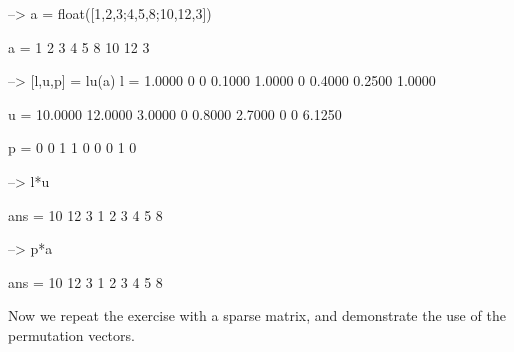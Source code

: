 \begin{DoxyVerbInclude}
--> a = float([1,2,3;4,5,8;10,12,3])

a = 
  1  2  3 
  4  5  8 
 10 12  3 

--> [l,u,p] = lu(a)
l = 
    1.0000         0         0 
    0.1000    1.0000         0 
    0.4000    0.2500    1.0000 

u = 
   10.0000   12.0000    3.0000 
         0    0.8000    2.7000 
         0         0    6.1250 

p = 
 0 0 1 
 1 0 0 
 0 1 0 

--> l*u

ans = 
 10 12  3 
  1  2  3 
  4  5  8 

--> p*a

ans = 
 10 12  3 
  1  2  3 
  4  5  8 
\end{DoxyVerbInclude}


Now we repeat the exercise with a sparse matrix, and demonstrate the use of the permutation vectors.


